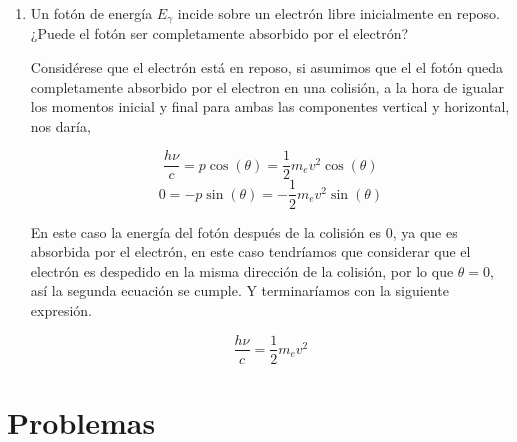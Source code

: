 \documentclass[12pt,a4paper]{article}
\begin{document}
\begin{enumerate}
Considerando la ecuación fotoeléctrica de Einstein, 

$$
K_{\mathrm{max}} = h\nu - \phi
$$

Donde, $K_{\mathrm{max}}$ es la energía cinética máxima del electron, $h\nu$ la energía de la luz incidente, y $\phi$ la energía minima para sacar al electrón del material, esto es una relación lineal, por lo que al duplicar la frecuencia del fotón incidente se duplica también la energía cinética maxima, y por consecuencia tendrá que cambiar el valor del potencial de frenado necesario para detener a los electrones.

\item Un fotón de energía $E_\gamma$ incide sobre un electrón libre inicialmente en reposo. ¿Puede el fotón ser completamente absorbido por el electrón?


Considérese que el electrón está en reposo, si asumimos que el el fotón queda completamente absorbido por el electron en una colisión, a la hora de igualar los momentos inicial y final para ambas las componentes vertical y horizontal, nos daría,

$$
\frac{h \nu}{c} = p\cos(\theta) = \frac{1}{2} m_e v^2 \cos(\theta)
$$
$$
0 = - p\sin(\theta) = - \frac{1}{2} m_e v^2 \sin(\theta)
$$

En este caso la energía del fotón después de la colisión es 0, ya que es absorbida por el electrón, en este caso tendríamos que considerar que el electrón es despedido en la misma dirección de la colisión, por lo que $\theta = 0$,  así la segunda ecuación se cumple. Y terminaríamos con la siguiente expresión.

$$
\frac{h \nu}{c} = \frac{1}{2} m_e v^2
$$



\end{enumerate}

\section*{Problemas}
\end{document}
